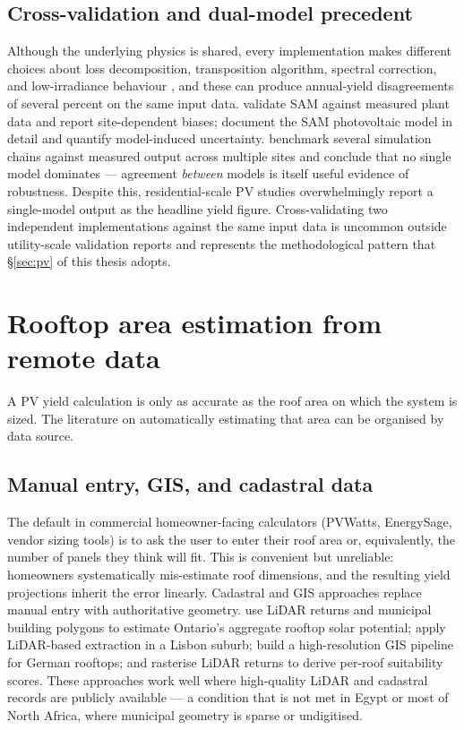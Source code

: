 \subsection{Cross-validation and dual-model precedent}
\label{sec:lit-pv-cross}

Although the underlying physics is shared, every implementation makes
different choices about loss decomposition, transposition algorithm,
spectral correction, and low-irradiance behaviour
\citep{mavromatakis2010}, and these can produce annual-yield
disagreements of several percent on the same input data.
\citet{freeman2014} validate SAM against measured plant data and
report site-dependent biases; \citet{gilman2018} document the SAM
photovoltaic model in detail and quantify model-induced uncertainty.
\citet{polo2020} benchmark several simulation chains against measured
output across multiple sites and conclude that no single model
dominates --- agreement \emph{between} models is itself useful
evidence of robustness. Despite this, residential-scale PV studies
overwhelmingly report a single-model output as the headline yield
figure. Cross-validating two independent implementations against the
same input data is uncommon outside utility-scale validation reports
and represents the methodological pattern that
\S\ref{sec:pv} of this thesis adopts.

\section{Rooftop area estimation from remote data}
\label{sec:lit-roof}

A PV yield calculation is only as accurate as the roof area on which
the system is sized. The literature on automatically estimating that
area can be organised by data source.

\subsection{Manual entry, GIS, and cadastral data}
\label{sec:lit-roof-manual}

The default in commercial homeowner-facing calculators (PVWatts,
EnergySage, vendor sizing tools) is to ask the user to enter their
roof area or, equivalently, the number of panels they think will
fit. This is convenient but unreliable: homeowners systematically
mis-estimate roof dimensions, and the resulting yield projections
inherit the error linearly. Cadastral and GIS approaches replace
manual entry with authoritative geometry. \citet{wiginton2010} use
LiDAR returns and municipal building polygons to estimate Ontario's
aggregate rooftop solar potential; \citet{brito2012} apply LiDAR-based
extraction in a Lisbon suburb; \citet{mainzer2014} build a
high-resolution GIS pipeline for German rooftops; and
\citet{lukac2014} rasterise LiDAR returns to derive per-roof
suitability scores. These approaches work well where high-quality
LiDAR and cadastral records are publicly available --- a condition
that is not met in Egypt or most of North Africa, where municipal
geometry is sparse or undigitised.

